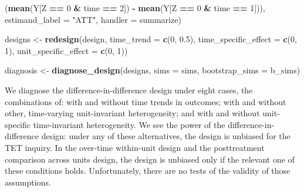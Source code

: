 \documentclass[
]{article}
\newenvironment{Shaded}{\begin{snugshade}}{\end{snugshade}}
\newcommand{\DataTypeTok}[1]{\textcolor[rgb]{0.13,0.29,0.53}{#1}}
\newcommand{\DecValTok}[1]{\textcolor[rgb]{0.00,0.00,0.81}{#1}}
\newcommand{\FloatTok}[1]{\textcolor[rgb]{0.00,0.00,0.81}{#1}}
\newcommand{\KeywordTok}[1]{\textcolor[rgb]{0.13,0.29,0.53}{\textbf{#1}}}
\newcommand{\NormalTok}[1]{#1}
\newcommand{\OperatorTok}[1]{\textcolor[rgb]{0.81,0.36,0.00}{\textbf{#1}}}
\newcommand{\StringTok}[1]{\textcolor[rgb]{0.31,0.60,0.02}{#1}}
\begin{document}
\begin{Shaded}
\begin{Highlighting}[]
\StringTok{      }\NormalTok{(}\KeywordTok{mean}\NormalTok{(Y[Z }\OperatorTok{==}\StringTok{ }\DecValTok{0} \OperatorTok{&}\StringTok{ }\NormalTok{time }\OperatorTok{==}\StringTok{ }\DecValTok{2}\NormalTok{]) }\OperatorTok{-}\StringTok{ }\KeywordTok{mean}\NormalTok{(Y[Z }\OperatorTok{==}\StringTok{ }\DecValTok{0} \OperatorTok{&}\StringTok{ }\NormalTok{time }\OperatorTok{==}\StringTok{ }\DecValTok{1}\NormalTok{])), }
    \DataTypeTok{estimand_label =} \StringTok{"ATT"}\NormalTok{, }\DataTypeTok{handler =}\NormalTok{ summarize)}

\NormalTok{designs <-}\StringTok{ }\KeywordTok{redesign}\NormalTok{(design, }
                    \DataTypeTok{time_trend =} \KeywordTok{c}\NormalTok{(}\DecValTok{0}\NormalTok{, }\FloatTok{0.5}\NormalTok{), }
                    \DataTypeTok{time_specific_effect =} \KeywordTok{c}\NormalTok{(}\DecValTok{0}\NormalTok{, }\DecValTok{1}\NormalTok{), }
                    \DataTypeTok{unit_specific_effect =} \KeywordTok{c}\NormalTok{(}\DecValTok{0}\NormalTok{, }\DecValTok{1}\NormalTok{))}
\end{Highlighting}
\end{Shaded}

\begin{Shaded}
\begin{Highlighting}[]
\NormalTok{diagnosis <-}\StringTok{ }\KeywordTok{diagnose_design}\NormalTok{(designs, }\DataTypeTok{sims =}\NormalTok{ sims, }\DataTypeTok{bootstrap_sims =}\NormalTok{ b_sims)}
\end{Highlighting}
\end{Shaded}

We diagnose the difference-in-difference design under eight cases, the
combinations of: with and without time trends in outcomes; with and
without other, time-varying unit-invariant heterogeneity; and with and
without unit-specific time-invariant heterogeneity. We see the power of
the difference-in-difference design: under any of these alternatives,
the design is unbiased for the TET inquiry. In the over-time within-unit
design and the posttreatment comparison across units design, the design
is unbiased only if the relevant one of these conditions holds.
Unfortunately, there are no tests of the validity of those assumptions.
\end{document}
